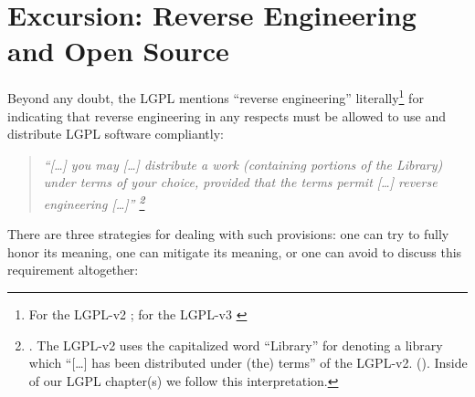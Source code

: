 %
%
%
%
%



\section{Excursion: Reverse Engineering and Open Source}

Beyond any doubt, the LGPL mentions \enquote{reverse engineering}
literally\footnote{For the LGPL-v2 \cite[cf.][\nopage wp., 
§6]{Lgpl21OsiLicense1999a}; for the LGPL-v3 \cite[cf.][\nopage wp., 
§4]{Lgpl30OsiLicense2007a} } for indicating that reverse engineering in any
respects must be allowed to use and distribute LGPL software compliantly:

\begin{quote}\noindent\emph{\enquote{[\ldots] you may [\ldots] distribute a work
(containing portions of the Library) under terms of your choice, provided that
the terms permit [\ldots] \emph{reverse engineering} [\ldots]}
\footnote{\cite[cf.][\nopage wp, §6]{Lgpl21OsiLicense1999a}. The LGPL-v2 uses
the capitalized word \enquote{Library} for denoting a library which
\enquote{[\ldots] has been distributed under (the) terms} of the LGPL-v2.
(\cite[cf.][\nopage wp, §0]{Lgpl21OsiLicense1999a}). Inside of our LGPL
chapter(s) we follow this interpretation. } }
\end{quote}

There are three strategies for dealing with such provisions: one can try to
fully honor its meaning, one can mitigate its meaning, or one can avoid to
discuss this requirement altogether:

